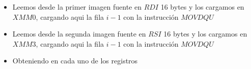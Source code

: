\begin{itemize}
\item Leemos desde la primer imagen fuente en $RDI$ 16 bytes y los cargamos en $XMM0$, cargando aqui la fila $i - 1$ con la instrucción $MOVDQU$
\item Leemos desde la segunda imagen fuente en $RSI$ 16 bytes y los cargamos en $XMM3$, cargando aqui la fila $i - 1$ con la instrucción $MOVDQU$

\item Obteniendo en cada uno de los registros

\begin{center}
\end{center}


\end{itemize}
